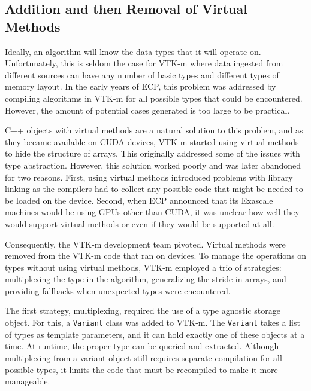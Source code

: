

\subsection{Addition and then Removal of Virtual Methods}


Ideally, an algorithm
will know the data types that it will operate on.
Unfortunately, this is seldom the case for VTK-m where data ingested from different sources can have any number of basic types
and different types of memory layout.
In the early years of ECP, this problem was addressed by compiling algorithms in VTK-m for all possible types that could be encountered.
However, the amount of potential cases generated is too large to be practical.

C++ objects with virtual methods are a natural solution to this problem, and as they became available on CUDA devices, VTK-m started using virtual methods to hide the structure of arrays.
This originally addressed some of the issues with type abstraction.
However, this solution worked poorly and was later abandoned for two reasons.
First, using virtual methods introduced problems with library linking as the compilers had to collect any possible code that might be needed to be loaded on the device.
Second, when ECP announced that its Exascale machines would be using GPUs other than CUDA, it was unclear how well they would support virtual methods or even if they would be supported at all.

Consequently, the VTK-m development team pivoted.
Virtual methods were removed from the VTK-m code that ran on devices.
To manage the operations on types without using virtual methods, VTK-m employed a trio of strategies: multiplexing the type in the algorithm, generalizing the stride in arrays, and providing fallbacks when unexpected types were encountered.

The first strategy, multiplexing, required the use of a type agnostic storage object.
For this, a \texttt{Variant} class was added to VTK-m.
The \texttt{Variant} takes a list of types as template parameters, and it can hold exactly one of these objects at a time.
At runtime, the proper type can be queried and extracted.
Although multiplexing from a variant object still requires separate compilation for all possible types, it limits the code that must be recompiled to make it more manageable.

